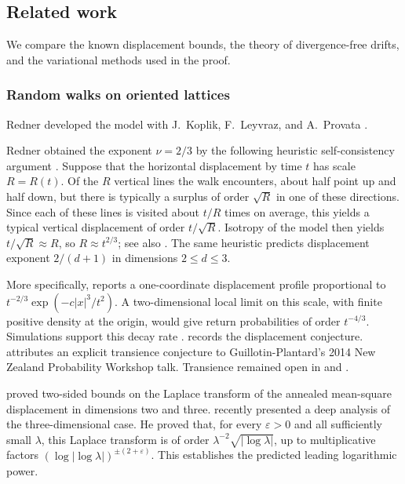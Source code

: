 \documentclass[11pt]{amsart}
\theoremstyle{plain}
\theoremstyle{definition}
\newcommand{\1}{\mathbf 1}
\newcommand{\abs}[1]{\lvert #1\rvert}
\begin{document}
\subsection{Related work}\label{ssec:related-work}

We compare the known displacement bounds, the theory of divergence-free
drifts, and the variational methods used in the proof.

\subsubsection{Random walks on oriented lattices}\label{sssec:oriented}

Redner developed the model with J.~Koplik, F.~Leyvraz, and A.~Provata
\citep*[p.~287]{Red89}.

Redner obtained the exponent $\nu=2/3$ by the following heuristic
self-consistency argument \citep*[p.~290]{Red89}.  Suppose that the
horizontal displacement by time $t$ has scale $R=R(t)$.  Of the $R$
vertical lines the walk encounters, about half point up and half down,
but there is typically a surplus of order $\sqrt{R}$ in one of these
directions.  Since each of these lines is visited about $t/R$ times on
average, this yields a typical vertical displacement of order
$t/\sqrt{R}$.  Isotropy of the model then yields $t/\sqrt{R}\approx R$,
so $R\approx t^{2/3}$; see also
\citet*[p.~152, item~\textup{(v)} and (1.73a)--(1.73b)]{BG90}.
The same heuristic predicts displacement exponent $2/(d+1)$
in dimensions $2\leq d\leq3$.

More specifically, \citet*[(3) and p.~290]{Red89} reports a one-coordinate
displacement profile proportional to $t^{-2/3}\exp(-c|x|^3/t^2)$.
A two-dimensional local limit on this scale, with finite positive density at
the origin, would give return probabilities of order $t^{-4/3}$.
Simulations support this decay rate
\citep*[Section~3.2]{MNOV20}.
\citet*[Section~3.5]{Pen20} records the displacement conjecture.
\citet*[Appendix~A, Conjecture~1 and reference~\textup{[10]}]{Bos19}
attributes an explicit transience conjecture to Guillotin-Plantard's
2014 New Zealand Probability Workshop talk.
Transience remained open in
\citet*[p.~1]{CHT19} and \citet*[p.~1]{BH23}.

\citet*[Theorem~1.1]{LTV18} proved two-sided bounds on the Laplace
transform of the annealed mean-square displacement in dimensions two and
three.  \citet*[Theorem~1.1]{Ngu26} recently presented a deep analysis of
the three-dimensional case.  He proved that, for every $\varepsilon>0$
and all sufficiently small $\lambda$, this Laplace transform is of order
$\lambda^{-2}\sqrt{\abs{\log\lambda}}$, up to multiplicative factors
$(\log\abs{\log\lambda})^{\pm(2+\varepsilon)}$.
This establishes the predicted leading logarithmic power.
\end{document}
